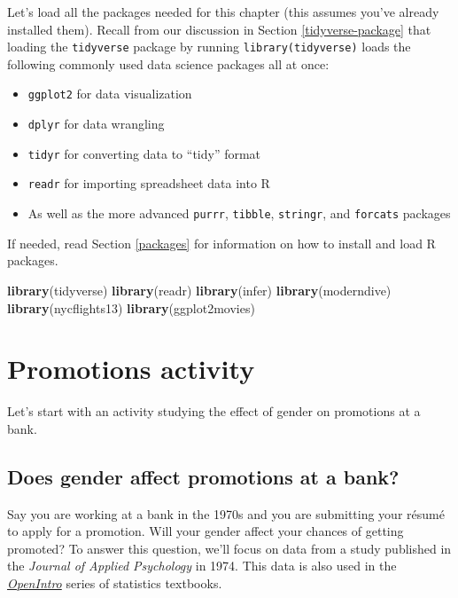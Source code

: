 \documentclass[
]{book}
\newenvironment{Shaded}{\begin{snugshade}}{\end{snugshade}}
\newcommand{\KeywordTok}[1]{\textcolor[rgb]{0.13,0.29,0.53}{\textbf{#1}}}
\newcommand{\NormalTok}[1]{#1}
\providecommand{\tightlist}{%
  \setlength{\itemsep}{0pt}\setlength{\parskip}{0pt}}
\begin{document}
Let's load all the packages needed for this chapter (this assumes you've already installed them). Recall from our discussion in Section \ref{tidyverse-package} that loading the \texttt{tidyverse} package by running \texttt{library(tidyverse)} loads the following commonly used data science packages all at once:

\begin{itemize}
\tightlist
\item
  \texttt{ggplot2} for data visualization
\item
  \texttt{dplyr} for data wrangling
\item
  \texttt{tidyr} for converting data to ``tidy'' format
\item
  \texttt{readr} for importing spreadsheet data into R
\item
  As well as the more advanced \texttt{purrr}, \texttt{tibble}, \texttt{stringr}, and \texttt{forcats} packages
\end{itemize}

If needed, read Section \ref{packages} for information on how to install and load R packages.

\begin{Shaded}
\begin{Highlighting}[]
\KeywordTok{library}\NormalTok{(tidyverse)}
\KeywordTok{library}\NormalTok{(readr)}
\KeywordTok{library}\NormalTok{(infer)}
\KeywordTok{library}\NormalTok{(moderndive)}
\KeywordTok{library}\NormalTok{(nycflights13)}
\KeywordTok{library}\NormalTok{(ggplot2movies)}
\end{Highlighting}
\end{Shaded}

\hypertarget{ht-activity}{%
\section{Promotions activity}\label{ht-activity}}

Let's start with an activity studying the effect of gender on promotions at a bank.

\hypertarget{does-gender-affect-promotions-at-a-bank}{%
\subsection{Does gender affect promotions at a bank?}\label{does-gender-affect-promotions-at-a-bank}}

Say you are working at a bank in the 1970s and you are submitting your résumé to apply for a promotion. Will your gender affect your chances of getting promoted? To answer this question, we'll focus on data from a study published in the \emph{Journal of Applied Psychology} in 1974. This data is also used in the \href{https://www.openintro.org/}{\emph{OpenIntro}} series of statistics textbooks.
\end{document}
